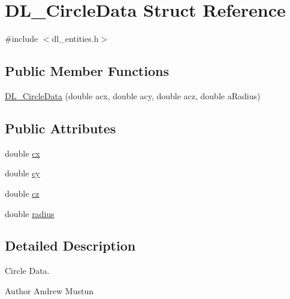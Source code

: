 \hypertarget{structDL__CircleData}{\section{D\-L\-\_\-\-Circle\-Data Struct Reference}
\label{structDL__CircleData}
}


{\ttfamily \#include $<$dl\-\_\-entities.\-h$>$}

\subsection*{Public Member Functions}
\begin{DoxyCompactItemize}
\item 
\hyperlink{structDL__CircleData_aa1f5a8b984f988a1b5beef8f5b188956}{D\-L\-\_\-\-Circle\-Data} (double acx, double acy, double acz, double a\-Radius)
\end{DoxyCompactItemize}
\subsection*{Public Attributes}
\begin{DoxyCompactItemize}
\item 
double \hyperlink{structDL__CircleData_a8abd50f4cb3276037f6673fb31bf9513}{cx}
\item 
double \hyperlink{structDL__CircleData_a9a7eaa2a80357e5c16a41c76b8dd5796}{cy}
\item 
double \hyperlink{structDL__CircleData_af0db7a3bedd1a4c0fcc173561f8d81f2}{cz}
\item 
double \hyperlink{structDL__CircleData_a0504d7c0f6012bb956b7aa0791a16dff}{radius}
\end{DoxyCompactItemize}


\subsection{Detailed Description}
Circle Data.

\begin{DoxyAuthor}{Author}
Andrew Mustun 
\end{DoxyAuthor}



